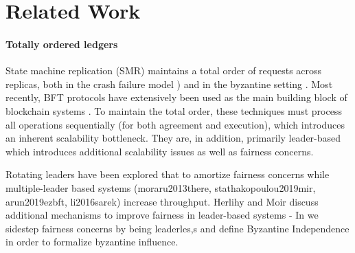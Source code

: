 
\section{Related Work}  
\paragraph{Totally ordered ledgers}
State machine replication (SMR) \cite{schneider1990implementing} maintains a total order of requests across replicas, both in the crash failure model  \cite{Li2007, Lampson2001, Lamport98Paxos, Lamport2005a, Lamport2005, Lamport01Paxos, Chandra2007}  \cite{junqueira2011zab, van2014vive, oki1988viewstampeda, liskov2012viewstamped, ongaro2014search}) and in the byzantine setting \cite{castro1999practical, martin2006fast, kotla2007zyzzyva,  gueta2018sbft, clement2009making, buchman2016tendermint, yin2019hotstuff, Clement09Upright, duan2014hbft    , pires2018generalized, bessani2014state, lamport2011byzantizing, arun2019ezbft, malkhi2019flexible, duan2014hbft, yin2003separating, Guerraoui08Next, Kotla04High,  liskov2010viewstamped}. Most recently, BFT protocols have extensively been used as the main building block of blockchain systems \cite{Hyperledger, EthereumQuorum, buchman2016tendermint, al2017chainspace, kokoris2018omniledger,  gilad2017algorand, baudet2019state}. To maintain the total order, these techniques must process  all operations sequentially (for both agreement and execution), which introduces an inherent scalability bottleneck. They are, in addition, primarily leader-based which introduces additional scalability issues \cite{moraru2013there, zhang2015tapir, stathakopoulou2019mir} as well as fairness concerns. 

Rotating leaders \cite{clement2009making, buchman2016tendermint, yin2019hotstuff} have been explored that to amortize fairness concerns while multiple-leader based systems (moraru2013there, stathakopoulou2019mir, arun2019ezbft, li2016sarek) increase throughput. Herlihy and Moir \cite{herlihy2016enhancing} discuss additional mechanisms to improve fairness in leader-based systems - In \sys we sidestep fairness concerns by being leaderles,s and define Byzantine Independence in order to formalize byzantine influence.

